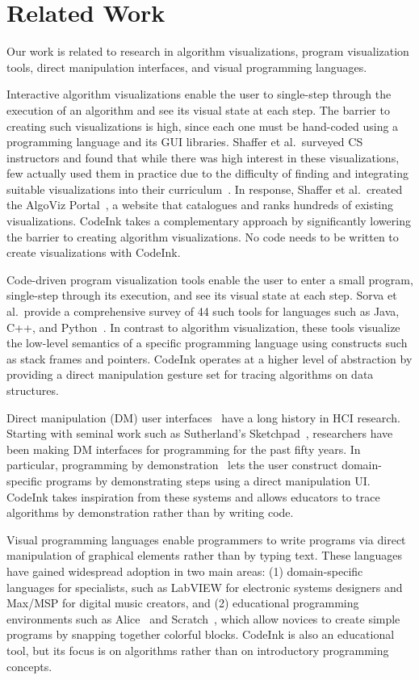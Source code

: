 \section{Related Work}

Our work is related to research in algorithm visualizations, program
visualization tools, direct manipulation interfaces, and visual
programming languages.

Interactive algorithm visualizations enable the user to single-step
through the execution of an algorithm and see its visual state at each
step. The barrier to creating such visualizations is high, since each
one must be hand-coded using a programming language and its GUI
libraries. Shaffer et al.\ surveyed CS instructors and found that while
there was high interest in these visualizations, few actually used them
in practice due to the difficulty of finding and integrating suitable
visualizations into their curriculum~\cite{Shaffer2011}. In response,
Shaffer et al.\ created the AlgoViz Portal~\cite{AlgoViz}, a website
that catalogues and ranks hundreds of existing visualizations. CodeInk
takes a complementary approach by significantly lowering the barrier to
creating algorithm visualizations. No code needs to be written to create
visualizations with CodeInk.

Code-driven program visualization tools enable the user to enter a small
program, single-step through its execution, and see its visual state at
each step. Sorva et al.\ provide a comprehensive survey of 44 such tools
for languages such as Java, C++, and Python~\cite{Sorva2013}. In
contrast to algorithm visualization, these tools visualize the low-level
semantics of a specific programming language using constructs such as
stack frames and pointers. CodeInk operates at a higher level of
abstraction by providing a direct manipulation gesture set for tracing
algorithms on data structures.

Direct manipulation (DM) user interfaces~\cite{Hutchins1985} have a long
history in HCI research. Starting with seminal work such as Sutherland's
Sketchpad~\cite{Sutherland1963}, researchers have been making DM
interfaces for programming for the past fifty years. In particular,
programming by demonstration~\cite{Cypher1993} lets the user construct
domain-specific programs by demonstrating steps using a direct
manipulation UI. CodeInk takes inspiration from these systems and allows
educators to trace algorithms by demonstration rather than by writing
code.

Visual programming languages enable programmers to write programs via
direct manipulation of graphical elements rather than by typing text. These
languages have gained widespread adoption in two main areas:
(1) domain-specific languages for specialists, such as LabVIEW for electronic
systems designers and Max/MSP for digital music creators, and (2) educational
programming environments such as Alice~\cite{Alice2008} and
Scratch~\cite{Scratch2008}, which allow novices to create simple programs by
snapping together colorful blocks. CodeInk is also an educational tool, but its
focus is on algorithms rather than on introductory programming concepts.

